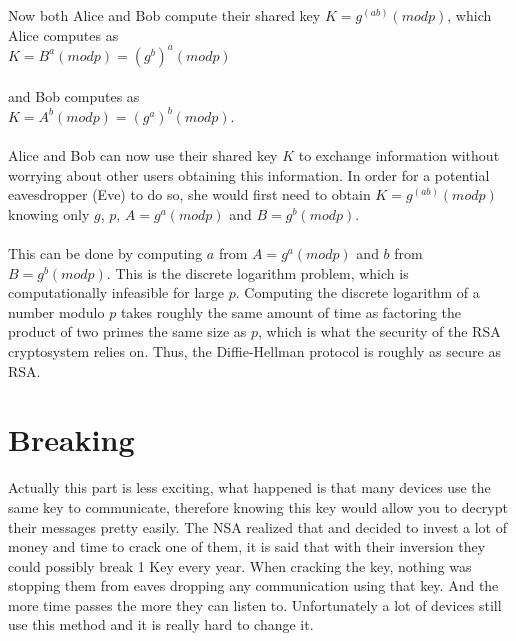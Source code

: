 \documentclass[10pt,a4paper]{report}
\begin{document}
Now both Alice and Bob compute their shared key $K=g^(ab) (mod p)$, which Alice computes as\\
$K=B^a (mod p)=(g^b)^a (mod p)$\\\\

and Bob computes as\\
$K=A^b (mod p)=(g^a)^b (mod p)$.\\\\

Alice and Bob can now use their shared key $K$ to exchange information without worrying about other users obtaining this information. In order for a potential eavesdropper (Eve) to do so, she would first need to obtain $K=g^(ab) (mod p)$ knowing only $g$, $p$, $A=g^a (mod p)$ and $B=g^b (mod p)$.\\\\

This can be done by computing $a$ from $A=g^a (mod p)$ and $b$ from $B=g^b (mod p)$. This is the discrete logarithm problem, which is computationally infeasible for large $p$. Computing the discrete logarithm of a number modulo $p$ takes roughly the same amount of time as factoring the product of two primes the same size as $p$, which is what the security of the RSA cryptosystem relies on. Thus, the Diffie-Hellman protocol is roughly as secure as RSA. 
\section{Breaking}
Actually this part is less exciting, what happened is that many devices use the same key to communicate, therefore knowing this key would allow you to decrypt their messages pretty easily. The NSA realized that and decided to invest a lot of money and time to crack one of them, it is said that with their inversion they could possibly break 1 Key every year. When cracking the key, nothing was stopping them from eaves dropping any communication using that key. And the more time passes the more they can listen to. Unfortunately a lot of devices still use this method and it is really hard to change it.
\end{document}
